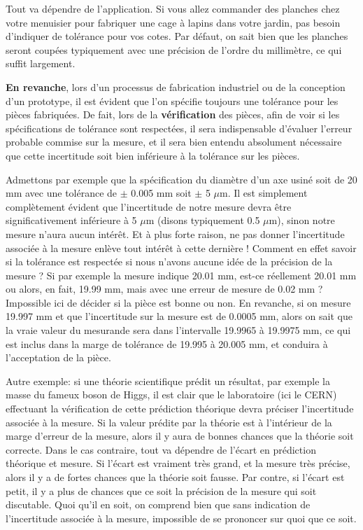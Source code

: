 Tout va dépendre de l'application. Si vous allez commander des planches chez votre menuisier pour fabriquer une cage à lapins dans votre jardin, pas besoin d'indiquer de tolérance pour vos cotes. Par défaut, on sait bien que les planches seront coupées typiquement avec une précision de l'ordre du millimètre, ce qui suffit largement.

\textbf{En revanche}, lors d'un processus de fabrication industriel ou de la conception d'un prototype, il est évident que l'on spécifie toujours une tolérance pour les pièces fabriquées. De fait, lors de la \textbf{vérification} des pièces, afin de voir si les spécifications de tolérance sont respectées, il sera indispensable d'évaluer l'erreur probable commise sur la mesure, et il sera bien entendu absolument nécessaire que cette incertitude soit bien inférieure à la tolérance sur les pièces.

Admettons par exemple que la spécification du diamètre d'un axe usiné soit de 20 mm avec une tolérance de $\pm$ 0.005 mm soit $\pm$ 5 $\mu$m. Il est simplement complètement évident que l'incertitude de notre mesure devra être significativement inférieure à 5 $\mu$m (disons typiquement 0.5 $\mu$m), sinon notre mesure n'aura aucun intérêt. Et à plus forte raison, ne pas donner l'incertitude associée à la mesure enlève tout intérêt à cette dernière ! Comment en effet savoir si la tolérance est respectée si nous n'avons aucune idée de la précision de la mesure ? Si par exemple la mesure indique 20.01 mm, est-ce réellement 20.01 mm ou alors, en fait, 19.99 mm, mais avec une erreur de mesure de 0.02 mm ? Impossible ici de décider si la pièce est bonne ou non. En revanche, si on mesure 19.997 mm et que l'incertitude sur la mesure est de 0.0005 mm, alors on sait que la vraie valeur du mesurande sera dans l'intervalle 19.9965 à 19.9975 mm, ce qui est inclus dans la marge de tolérance de 19.995 à 20.005 mm, et conduira à l'acceptation de la pièce.

Autre exemple: si une théorie scientifique prédit un résultat, par exemple la masse du fameux boson de Higgs, il est clair que le laboratoire (ici le CERN) effectuant la vérification de cette prédiction théorique devra préciser l'incertitude associée à la mesure. Si la valeur prédite par la théorie est à l'intérieur de la marge d'erreur de la mesure, alors il y aura de bonnes chances que la théorie soit correcte. Dans le cas contraire, tout va dépendre de l'écart en prédiction théorique et mesure. Si l'écart est vraiment très grand, et la mesure très précise, alors il y a de fortes chances que la théorie soit fausse. Par contre, si l'écart est petit, il y a plus de chances que ce soit la précision de la mesure qui soit discutable. Quoi qu'il en soit, on comprend bien que sans indication de l'incertitude associée à la mesure, impossible de se prononcer sur quoi que ce soit.

